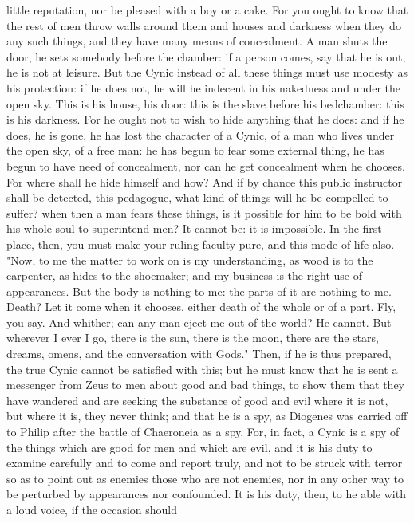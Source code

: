 \documentclass[a4paper]{article}
\begin{document}
little reputation, nor be pleased with a boy or a cake. For you ought to know
that the rest of men throw walls around them and houses and darkness when they
do any such things, and they have many means of concealment. A man shuts the
door, he sets somebody before the chamber: if a person comes, say that he is
out, he is not at leisure. But the Cynic instead of all these things must use
modesty as his protection: if he does not, he will he indecent in his nakedness
and under the open sky. This is his house, his door: this is the slave before
his bedchamber: this is his darkness. For he ought not to wish to hide anything
that he does: and if he does, he is gone, he has lost the character of a Cynic,
of a man who lives under the open sky, of a free man: he has begun to fear some
external thing, he has begun to have need of concealment, nor can he get
concealment when he chooses. For where shall he hide himself and how? And if by
chance this public instructor shall be detected, this pedagogue, what kind of
things will he be compelled to suffer? when then a man fears these things, is
it possible for him to be bold with his whole soul to superintend men? It
cannot be: it is impossible.
    In the first place, then, you must make your ruling faculty pure, and this
mode of life also. "Now, to me the matter to work on is my understanding, as
wood is to the carpenter, as hides to the shoemaker; and my business is the
right use of appearances. But the body is nothing to me: the parts of it are
nothing to me. Death? Let it come when it chooses, either death of the whole or
of a part. Fly, you say. And whither; can any man eject me out of the world? He
cannot. But wherever I ever I go, there is the sun, there is the moon, there
are the stars, dreams, omens, and the conversation with Gods."
    Then, if he is thus prepared, the true Cynic cannot be satisfied with this;
but he must know that he is sent a messenger from Zeus to men about good and
bad things, to show them that they have wandered and are seeking the substance
of good and evil where it is not, but where it is, they never think; and that
he is a spy, as Diogenes was carried off to Philip after the battle of
Chaeroneia as a spy. For, in fact, a Cynic is a spy of the things which are
good for men and which are evil, and it is his duty to examine carefully and to
come and report truly, and not to be struck with terror so as to point out as
enemies those who are not enemies, nor in any other way to be perturbed by
appearances nor confounded.
    It is his duty, then, to he able with a loud voice, if the occasion should
\end{document}
